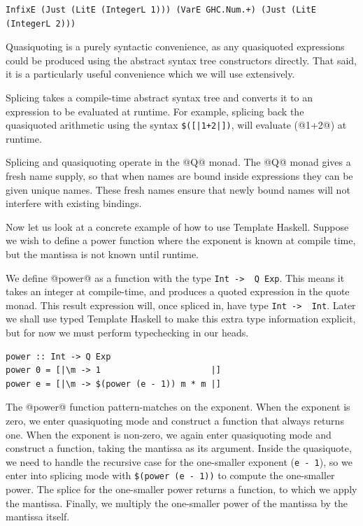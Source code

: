\begin{lstlisting}
InfixE (Just (LitE (IntegerL 1))) (VarE GHC.Num.+) (Just (LitE (IntegerL 2)))
\end{lstlisting}

Quasiquoting is a purely syntactic convenience, as any quasiquoted expressions could be produced using the abstract syntax tree constructors directly.
That said, it is a particularly useful convenience which we will use extensively.

Splicing takes a compile-time abstract syntax tree and converts it to an expression to be evaluated at runtime.
For example, splicing back the quasiquoted arithmetic using the syntax \lstinline/$([|1+2|])/, will evaluate (@1+2@) at runtime.

Splicing and quasiquoting operate in the @Q@ monad.
The @Q@ monad gives a fresh name supply, so that when names are bound inside expressions they can be given unique names.
These fresh names ensure that newly bound names will not interfere with existing bindings.

Now let us look at a concrete example of how to use Template Haskell.
Suppose we wish to define a power function where the exponent is known at compile time, but the mantissa is not known until runtime.

We define @power@ as a function with the type \lstinline/Int ->  Q Exp/.
This means it takes an integer at compile-time, and produces a quoted expression in the quote monad.
This result expression will, once spliced in, have type \lstinline/Int ->  Int/.
Later we shall use typed Template Haskell to make this extra type information explicit, but for now we must perform typechecking in our heads.

\begin{lstlisting}
power :: Int -> Q Exp
power 0 = [|\m -> 1                      |]
power e = [|\m -> $(power (e - 1)) m * m |]
\end{lstlisting}

The @power@ function pattern-matches on the exponent.
When the exponent is zero, we enter quasiquoting mode and construct a function that always returns one.
When the exponent is non-zero, we again enter quasiquoting mode and construct a function, taking the mantissa as its argument.
Inside the quasiquote, we need to handle the recursive case for the one-smaller exponent (\lstinline/e - 1/), so we enter into splicing mode with \lstinline/$(power (e - 1))/ to compute the one-smaller power.
The splice for the one-smaller power returns a function, to which we apply the mantissa.
Finally, we multiply the one-smaller power of the mantissa by the mantissa itself.

